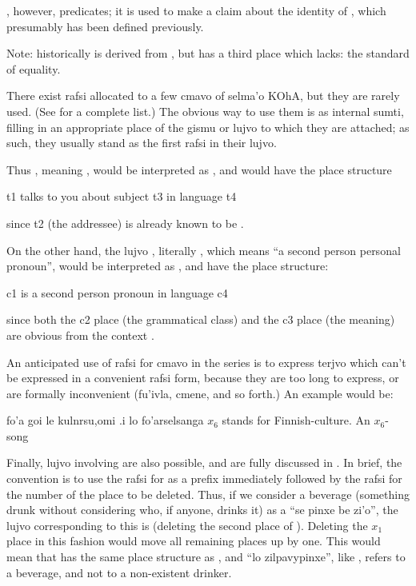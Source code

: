 , however, predicates; it
    is used to make a claim about the identity of , which
    presumably has been defined previously.

Note:  historically is derived from , but
     has a third place which  lacks: the standard of
    equality.



There exist rafsi allocated to a few cmavo of selma'o KOhA,
    but they are rarely used. (See 
    for a complete list.) The obvious way to use them is as
    internal sumti, filling in an appropriate place of the gismu or
    lujvo to which they are attached; as such, they usually stand
    as the first rafsi in their lujvo.

Thus , meaning , would be interpreted
    as , and would have the place structure
\begin{example}
t1 talks to you about subject t3 in language t4
\end{example}

{\noindent}since t2 (the addressee) is already known to be . 

On the other hand, the lujvo , literally
    , which means ``a second person personal
    pronoun'', would be interpreted as , and have
    the place structure:
\begin{example}
c1 is a second person pronoun in language c4
\end{example}

{\noindent}since both the c2 place (the grammatical class) and the c3
    place (the meaning) are obvious from the context . 

An anticipated use of rafsi for cmavo in the  series
    is to express terjvo which can't be expressed in a convenient
    rafsi form, because they are too long to express, or are
    formally inconvenient (fu'ivla, cmene, and so forth.) An
    example would be:
\begin{example}
fo'a goi le kulnrsu,omi .i lo fo'arselsanga\n
$x_6$ stands for Finnish-culture.  An $x_6$-song
\end{example}

Finally, lujvo involving  are also possible, and are
    fully discussed in . In
    brief, the convention is to use the rafsi for  as a
    prefix immediately followed by the rafsi for the number of the
    place to be deleted. Thus, if we consider a beverage (something
    drunk without considering who, if anyone, drinks it) as a ``se
    pinxe be zi'o'', the lujvo corresponding to this is
     (deleting the second place of ).
    Deleting the $x_1$ place in this fashion would move all remaining
    places up by one. This would mean that  has the
    same place structure as , and ``lo
    zilpavypinxe'', like , refers to a
    beverage, and not to a non-existent drinker. 

